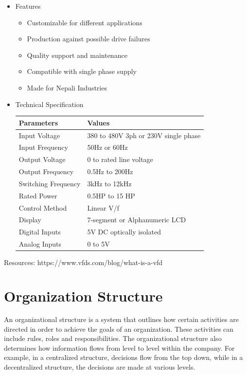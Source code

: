 \documentclass[12pt,a4paper]{scrreprt}
\begin{document}
\begin{enumerate}
\begin{itemize}
      \item Features
        \begin{itemize}
          \item Customizable for different applications
          \item Production against possible drive failures
          \item Quality support and maintenance
          \item Compatible with single phase supply
          \item Made for Nepali Industries
        \end{itemize}

      \item Technical Specification
        \begin{center}
          \begin{tabular}{|l|l|}
            \hline
            Parameters & Values \\
            \hline
            Input Voltage & 380 to 480V 3ph or 230V single phase \\
            Input Frequency & 50Hz or 60Hz \\
            Output Voltage & 0 to rated line voltage \\
            Output Frequency & 0.5Hz to 200Hz \\
            Switching Frequency & 3kHz to 12kHz \\
            Rated Power & 0.5HP to 15 HP \\
            Control Method & Linear V/f \\
            Display & 7-segment or Alphanumeric LCD \\
            Digital Inputs & 5V DC optically isolated \\
            Analog Inputs & 0 to 5V \\
            \hline
          \end{tabular}
        \end{center}
    \end{itemize}
    Resources: https://www.vfds.com/blog/what-is-a-vfd
\end{enumerate}
\chapter{Organization Structure}

An organizational structure is a system that outlines how certain activities are directed in order to achieve the goals of an organization. These activities can include rules, roles and responsibilities. The organizational structure also determines how information flows from level to level within the company. For example, in a centralized structure, decisions flow from the top down, while in a decentralized structure, the decisions are made at various levels. \\
\end{document}
